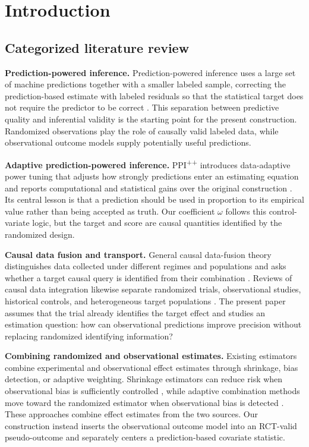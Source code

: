 \section{Introduction}
\label{sec:introduction}
\subsection{Categorized literature review}
\label{sec:literature}

\textbf{Prediction-powered inference.} Prediction-powered inference uses a large set of machine predictions together with a smaller labeled sample, correcting the prediction-based estimate with labeled residuals so that the statistical target does not require the predictor to be correct \citep{angelopoulos2023ppi}. This separation between predictive quality and inferential validity is the starting point for the present construction. Randomized observations play the role of causally valid labeled data, while observational outcome models supply potentially useful predictions.

\textbf{Adaptive prediction-powered inference.} PPI\textsuperscript{++} introduces data-adaptive power tuning that adjusts how strongly predictions enter an estimating equation and reports computational and statistical gains over the original construction \citep{angelopoulos2024ppipp}. Its central lesson is that a prediction should be used in proportion to its empirical value rather than being accepted as truth. Our coefficient $\omega$ follows this control-variate logic, but the target and score are causal quantities identified by the randomized design.

\textbf{Causal data fusion and transport.} General causal data-fusion theory distinguishes data collected under different regimes and populations and asks whether a target causal query is identified from their combination \citep{bareinboim2016fusion}. Reviews of causal data integration likewise separate randomized trials, observational studies, historical controls, and heterogeneous target populations \citep{shi2022integration}. The present paper assumes that the trial already identifies the target effect and studies an estimation question: how can observational predictions improve precision without replacing randomized identifying information?

\textbf{Combining randomized and observational estimates.} Existing estimators combine experimental and observational effect estimates through shrinkage, bias detection, or adaptive weighting. Shrinkage estimators can reduce risk when observational bias is sufficiently controlled \citep{rosenman2020shrinkage}, while adaptive combination methods move toward the randomized estimator when observational bias is detected \citep{cheng2021adaptive}. These approaches combine effect estimates from the two sources. Our construction instead inserts the observational outcome model into an RCT-valid pseudo-outcome and separately centers a prediction-based covariate statistic.

